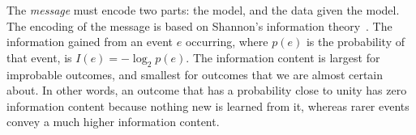 \documentclass{elsarticle}
\begin{document}

The \textit{message} must encode two parts: the model, and the data given the
model. The encoding of the message is based on Shannon's information theory~\cite{shannon}. 
The information gained from an event $e$ occurring, where $p(e)$ is the
probability of that event, is $I(e) = -\log_{2}{p(e)}$. The information content
is largest for improbable outcomes, and smallest for outcomes that we are 
almost certain about. In other words, an outcome that has a probability close
to unity has zero information content because nothing new is learned from it,
whereas rarer events convey a much higher information content.


\end{document}
